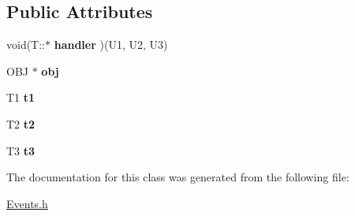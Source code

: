 \subsection*{Public Attributes}
\begin{DoxyCompactItemize}
\item 
\hypertarget{class_event3_a2b4a3b7dbddc1dc7954942e7b2fe5745}{void(T\-::$\ast$ {\bfseries handler} )(U1, U2, U3)}\label{class_event3_a2b4a3b7dbddc1dc7954942e7b2fe5745}

\item 
\hypertarget{class_event3_adf320f52db00df12079299c183cb84d0}{O\-B\-J $\ast$ {\bfseries obj}}\label{class_event3_adf320f52db00df12079299c183cb84d0}

\item 
\hypertarget{class_event3_ad42449bd6cd4193bfb6557dc54c51eb8}{T1 {\bfseries t1}}\label{class_event3_ad42449bd6cd4193bfb6557dc54c51eb8}

\item 
\hypertarget{class_event3_a40afc3cdc9d75a5b3163795b78a42497}{T2 {\bfseries t2}}\label{class_event3_a40afc3cdc9d75a5b3163795b78a42497}

\item 
\hypertarget{class_event3_a7aa650837c6a02999bcad51817b144ef}{T3 {\bfseries t3}}\label{class_event3_a7aa650837c6a02999bcad51817b144ef}

\end{DoxyCompactItemize}


The documentation for this class was generated from the following file\-:\begin{DoxyCompactItemize}
\item 
\hyperlink{_events_8h}{Events.\-h}\end{DoxyCompactItemize}
